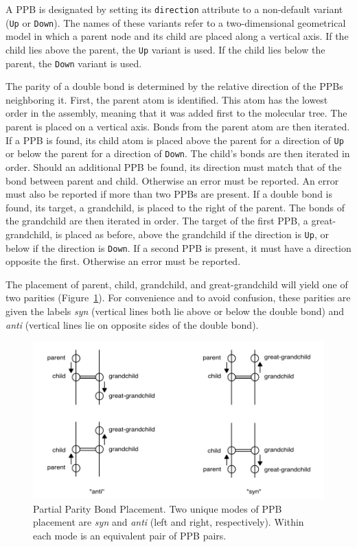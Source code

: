 \documentclass{article}
\def\ttt{\texttt}
\begin{document}
A PPB is designated by setting its \ttt{direction} attribute to a non-default variant (\ttt{Up} or \ttt{Down}). The names of these variants refer to a two-dimensional geometrical model in which a parent node and its child are placed along a vertical axis. If the child lies above the parent, the \ttt{Up} variant is used. If the child lies below the parent, the \ttt{Down} variant is used.

The parity of a double bond is determined by the relative direction of the PPBs neighboring it. First, the parent atom is identified. This atom has the lowest order in the assembly, meaning that it was added first to the molecular tree. The parent is placed on a vertical axis. Bonds from the parent atom are then iterated. If a PPB is found, its child atom is placed above the parent for a direction of \ttt{Up} or below the parent for a direction of \ttt{Down}. The child's bonds are then iterated in order. Should an additional PPB be found, its direction must match that of the bond between parent and child. Otherwise an error must be reported. An error must also be reported if more than two PPBs are present. If a double bond is found, its target, a grandchild, is placed to the right of the parent. The bonds of the grandchild are then iterated in order. The target of the first PPB, a great-grandchild, is placed as before, above the grandchild if the direction is \ttt{Up}, or below if the direction is \ttt{Down}. If a second PPB is present, it must have a direction opposite the first. Otherwise an error must be reported.

The placement of parent, child, grandchild, and great-grandchild will yield one of two parities (Figure~\ref{fig:ppb-placement}). For convenience and to avoid confusion, these parities are given the labels  \textit{syn} (vertical lines both lie above or below the double bond) and \textit{anti} (vertical lines lie on opposite sides of the double bond).

\begin{figure}
    \centering
    \includegraphics[width=\columnwidth]{partial-parity-bond-placement.pdf}
    \caption{Partial Parity Bond Placement. Two unique modes of PPB placement are \textit{syn} and \textit{anti} (left and right, respectively). Within each mode is an equivalent pair of PPB pairs.}
    \label{fig:ppb-placement}
\end{figure}
\end{document}

